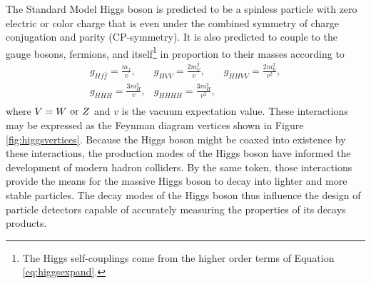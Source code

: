 The Standard Model Higgs boson is predicted to be a spinless particle with zero electric or color charge that is even under the combined symmetry of charge conjugation and parity (CP-symmetry). It is also predicted to couple to the gauge bosons, fermions, and itself\footnote{The Higgs self-couplings come from the higher order terms of Equation \ref{eq:higgsexpand}.} in proportion to their masses according to
\begin{equation}
  \begin{array}{ccc}
    g_{Hf\bar{f}} = \frac{m_{f}}{v}, & g_{HVV} = \frac{2m_{V}^{2}}{v}, & g_{HHVV} = \frac{2m_{V}^{2}}{v^{2}}, \\[1em]
    g_{HHH} = \frac{3m_{H}^{2}}{v},  & g_{HHHH} = \frac{3m_{H}^{2}}{v^{2}}, \\
  \end{array}
\end{equation}
where $V = W\ \mathrm{or}\ Z$ and $v$ is the vacuum expectation value.\cite{PDG2018} These interactions may be expressed as the Feynman diagram vertices shown in Figure \ref{fig:higgsvertices}. Because the Higgs boson might be coaxed into existence by these interactions, the production modes of the Higgs boson have informed the development of modern hadron colliders. By the same token, those interactions provide the means for the massive Higgs boson to decay into lighter and more stable particles. The decay modes of the Higgs boson thus influence the design of particle detectors capable of accurately measuring the properties of its decays products.

